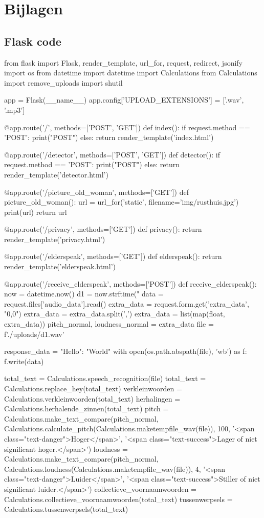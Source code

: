 \chapter{Bijlagen}
\label{ch:bijlagen}

\section{Flask code}
\label{bijlage:flask}
\begin{python}
from flask import Flask, render_template, url_for, request, redirect, jsonify
import os
from datetime import datetime
import Calculations
from Calculations import remove_uploads
import shutil

app = Flask(__name__)
app.config['UPLOAD_EXTENSIONS'] = ['.wav', '.mp3']


@app.route('/', methods=['POST', 'GET'])
def index():
   if request.method == 'POST':
        print("POST")
   else:
        return render_template('index.html')


@app.route('/detector', methods=['POST', 'GET'])
def detector():
   if request.method == 'POST':
        print("POST")
   else:
        return render_template('detector.html')


@app.route('/picture_old_woman', methods=['GET'])
def picture_old_woman():
   url = url_for('static', filename='img/rusthuis.jpg')
   print(url)
   return url


@app.route('/privacy', methods=['GET'])
def privacy():
    return render_template('privacy.html')


@app.route('/elderspeak', methods=['GET'])
def elderspeak():
    return render_template('elderspeak.html')


@app.route('/receive_elderspeak', methods=['POST'])
def receive_elderspeak():
   now = datetime.now()
   d1 = now.strftime("%
   data = request.files['audio_data'].read()
   extra_data = request.form.get('extra_data', "0,0")
   extra_data = extra_data.split(',')
   extra_data = list(map(float, extra_data))
   pitch_normal, loudness_normal = extra_data
   file = f'./uploads/{d1}.wav'

   response_data = {"Hello": "World"}
   with open(os.path.abspath(file), 'wb') as f:
   f.write(data)

   total_text = Calculations.speech_recognition(file)
   total_text = Calculations.replace_hey(total_text)
   verkleinwoorden = Calculations.verkleinwoorden(total_text)
   herhalingen = Calculations.herhalende_zinnen(total_text)
   pitch = Calculations.make_text_compare(pitch_normal,
   Calculations.calculate_pitch(Calculations.maketempfile_wav(file)),
        100,
       '<span class="text-danger">Hoger</span>',
       '<span class="text-success">Lager of niet significant hoger.</span>')
   loudness = Calculations.make_text_compare(pitch_normal,
       Calculations.loudness(Calculations.maketempfile_wav(file)),
       4,
       '<span class="text-danger">Luider</span>',
       '<span class="text-success">Stiller of niet significant luider.</span>')
   collectieve_voornaamwoorden = Calculations.collectieve_voornaamwoorden(total_text)
   tussenwerpsels = Calculations.tussenwerpsels(total_text)


\end{python}
